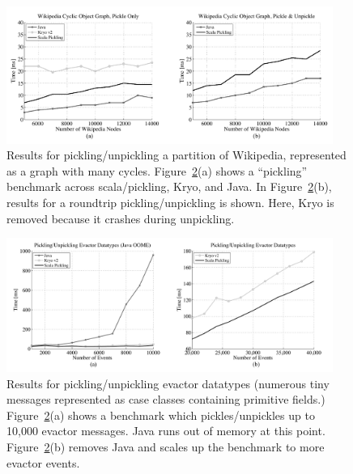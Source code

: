 \documentclass[10pt]{sigplanconf}
\theoremstyle{definition}
\theoremstyle{definition}
\begin{document}

\begin{figure}[ht!]
 \centering
 \includegraphics[width=0.95\textwidth]{wikigraph.pdf}
 \caption{Results for pickling/unpickling a partition of Wikipedia, represented as a graph with many cycles. Figure~\ref{fig:evactor}(a) shows a ``pickling'' benchmark across scala/pickling, Kryo, and Java. In Figure~\ref{fig:evactor}(b), results for a roundtrip pickling/unpickling is shown. Here, Kryo is removed because it crashes during unpickling.}
 \label{fig:wikigraph}
\end{figure}

\begin{figure}[ht!]
 \centering
 \includegraphics[width=0.95\textwidth]{evactor.pdf}
 \caption{Results for pickling/unpickling evactor datatypes (numerous tiny messages represented as case classes containing primitive fields.) Figure~\ref{fig:evactor}(a) shows a benchmark which pickles/unpickles up to 10,000 evactor messages. Java runs out of memory at this point. Figure~\ref{fig:evactor}(b) removes Java and scales up the benchmark to more evactor events.}
 \label{fig:evactor}
\end{figure}
\end{document}
